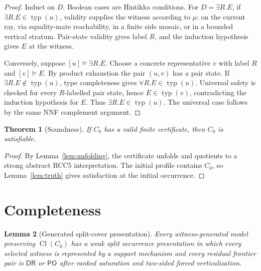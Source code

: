 \documentclass[11pt]{article}
\newtheorem{theorem}{Theorem}[section]
\newtheorem{lemma}[theorem]{Lemma}
\newcommand{\DR}{\mathsf{DR}}
\newcommand{\PO}{\mathsf{PO}}
\newcommand{\Cl}{\operatorname{Cl}}
\newcommand{\typ}{\operatorname{typ}}
\begin{document}
\begin{proof}
Induct on $D$.  Boolean cases are Hintikka conditions.  For $D=\exists R.E$, if $\exists R.E\in\typ(u)$, validity supplies the witness according to $\mu$: on the current ray, via equality-mate reachability, in a finite side mosaic, or in a bounded vertical stratum.  Pair-state validity gives label $R$, and the induction hypothesis gives $E$ at the witness.

Conversely, suppose $[u]\models\exists R.E$.  Choose a concrete representative $v$ with label $R$ and $[v]\models E$.  By product exhaustion the pair $(u,v)$ has a pair state.  If $\exists R.E\notin\typ(u)$, type completeness gives $\forall R.\overline E\in\typ(u)$.  Universal safety is checked for every $R$-labelled pair state, hence $\overline E\in\typ(v)$, contradicting the induction hypothesis for $E$.  Thus $\exists R.E\in\typ(u)$.  The universal case follows by the same NNF complement argument.
\end{proof}

\begin{theorem}[Soundness]
If $C_0$ has a valid finite certificate, then $C_0$ is satisfiable.
\end{theorem}

\begin{proof}
By Lemma~\ref{lem:unfolding}, the certificate unfolds and quotients to a strong abstract RCC5 interpretation.  The initial profile contains $C_0$, so Lemma~\ref{lem:truth} gives satisfaction at the initial occurrence.
\end{proof}

\section{Completeness}

\begin{lemma}[Generated split-cover presentation]
\label{lem:split-cover}
Every witness-generated model preserving $\Cl(C_0)$ has a weak split occurrence presentation in which every selected witness is represented by a support mechanism and every residual frontier pair is $\DR$ or $\PO$ after ranked saturation and two-sided forced verticalization.
\end{lemma}
\end{document}
